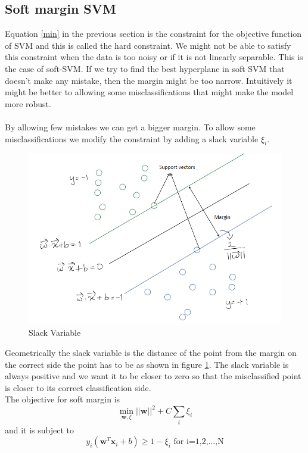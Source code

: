 \documentclass[11pt]{article}
\begin{document}
\subsection{Soft margin SVM}
Equation \ref{min} in the previous section is the constraint for the objective function of SVM and this is called the hard constraint. We might not be able to satisfy this constraint when the data is too noisy or if it is not linearly separable. This is the case of soft-SVM. If we try to find the best hyperplane in soft SVM that doesn't make any mistake, then the margin might be too narrow. Intuitively it might be better to allowing some misclassifications that might make the model more robust. \\ \\
By allowing few mistakes we can get a bigger margin. To allow some misclassifications we modify the constraint by adding a slack variable $\xi_i$. 
\begin{figure}[h!]
    \centering
  \includegraphics[scale=0.7]{fig4.PNG}
  \caption{Slack Variable}
  \label{fig:SV}
\end{figure}
Geometrically the slack variable is the distance of the point from the margin on the correct side the point has to be as shown in figure \ref{fig:SV}. The slack variable is always positive and we want it to be closer to zero so that the misclassified point is closer to its correct classification side. 
\\The objective for soft margin is \begin{equation}
    \label{min2}
    \min_{\mathbf{w},\xi}||\mathbf{w}||^2 + C\sum_i \xi_i
\end{equation} and it is subject to \begin{equation}
    \label{min2_constraints} y_i(\mathbf{w}^{T}\mathbf{x}_i+b)\geq 1-\xi_i \text{ for i=1,2,...,N}
\end{equation}
\end{document}
